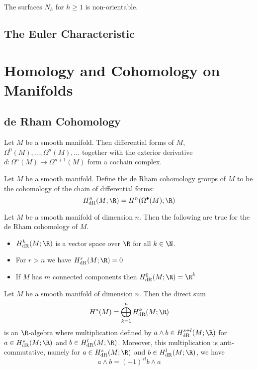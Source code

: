 \documentclass[a4paper]{article}
\begin{document}
\begin{crl}{}{} The surfaces $N_h$ for $h\geq 1$ is non-orientable. 
\end{crl}

\subsection{The Euler Characteristic}


\pagebreak
\section{Homology and Cohomology on Manifolds}
\subsection{de Rham Cohomology}
\begin{prp}{}{} Let $M$ be a smooth manifold. Then differential forms of $M$, $\Omega^0(M),\dots,\Omega^n(M),\dots$ together with the exterior derivative $d:\Omega^n(M)\to\Omega^{n+1}(M)$ form a cochain complex. 
\end{prp}

\begin{defn}{}{} Let $M$ be a smooth manifold. Define the de Rham cohomology groups of $M$ to be the cohomology of the chain of differential forms: $$H_{\text{dR}}^n(M;\R)=H^n(\Omega^\bullet(M);\R)$$
\end{defn}

\begin{prp}{}{} Let $M$ be a smooth manifold of dimension $n$. Then the following are true for the de Rham cohomology of $M$. 
\begin{itemize}
\item $H_{\text{dR}}^k(M;\R)$ is a vector space over $\R$ for all $k\in\N$. 
\item For $r>n$ we have $H_{\text{dR}}^r(M;\R)=0$
\item If $M$ has $m$ connected components then $H_{\text{dR}}^0(M;\R)=\R^k$
\end{itemize}
\end{prp}

\begin{thm}{}{} Let $M$ be a smooth manifold of dimension $n$. Then the direct sum $$H^\ast(M)=\bigoplus_{k=1}^nH_{\text{dR}}^k(M;\R)$$ is an $\R$-algebra where multiplication defined by $a\wedge b\in H_{\text{dR}}^{s+l}(M;\R)$ for $a\in H_{\text{dR}}^s(M;\R)$ and $b\in H_{\text{dR}}^l(M;\R)$. Moreover, this multiplication is anti-commutative, namely for $a\in H_{\text{dR}}^s(M;\R)$ and $b\in H_{\text{dR}}^l(M;\R)$, we have $$a\wedge b=(-1)^{sl}b\wedge a$$
\end{thm}
\end{document}
